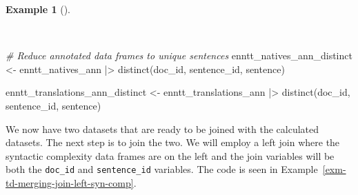 \documentclass[
  letterpaper,
  DIV=11,
  numbers=noendperiod]{scrreport}
\newenvironment{Shaded}{\begin{snugshade}}{\end{snugshade}}
\newcommand{\CommentTok}[1]{\textcolor[rgb]{0.00,0.00,0.00}{\textit{#1}}}
\newcommand{\FunctionTok}[1]{\textcolor[rgb]{0.00,0.00,0.00}{#1}}
\newcommand{\NormalTok}[1]{\textcolor[rgb]{0.00,0.00,0.00}{#1}}
\newcommand{\OtherTok}[1]{\textcolor[rgb]{0.00,0.00,0.00}{#1}}
\newcommand{\SpecialCharTok}[1]{\textcolor[rgb]{0.00,0.00,0.00}{#1}}
\theoremstyle{definition}
\newtheorem{example}{Example}[chapter]
\theoremstyle{remark}
\begin{document}
\begin{example}[]\protect\hypertarget{exm-td-merging-annotation-distinct}{}\label{exm-td-merging-annotation-distinct}

~

\begin{Shaded}
\begin{Highlighting}[]
\CommentTok{\# Reduce annotated data frames to unique sentences}
\NormalTok{enntt\_natives\_ann\_distinct }\OtherTok{\textless{}{-}} 
\NormalTok{  enntt\_natives\_ann }\SpecialCharTok{|\textgreater{}} 
  \FunctionTok{distinct}\NormalTok{(doc\_id, sentence\_id, sentence)}

\NormalTok{enntt\_translations\_ann\_distinct }\OtherTok{\textless{}{-}} 
\NormalTok{  enntt\_translations\_ann }\SpecialCharTok{|\textgreater{}} 
  \FunctionTok{distinct}\NormalTok{(doc\_id, sentence\_id, sentence)}
\end{Highlighting}
\end{Shaded}

\end{example}

We now have two datasets that are ready to be joined with the calculated
datasets. The next step is to join the two. We will employ a left join
where the syntactic complexity data frames are on the left and the join
variables will be both the \texttt{doc\_id} and \texttt{sentence\_id}
variables. The code is seen in
Example~\ref{exm-td-merging-join-left-syn-comp}.
\end{document}
